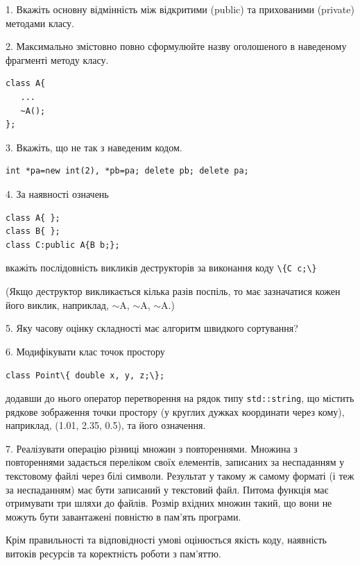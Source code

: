 \documentclass[12pt, ukrainian]{article}
\def\code#1{\Verb!#1!}
\begin{document}
{%
1. Вкажіть основну відмінність між відкритими (public) та прихованими (private) методами класу.%
\par
\vspace{2mm}
2. Максимально змістовно повно сформулюйте назву оголошеного в наведеному фрагменті методу класу.
\vspace{-3mm}
\begin{verbatim}class A{
   ...
   ~A();
};\end{verbatim}
\vspace{-3mm}
\par
\vspace{2mm}
3. Вкажіть, що не так з наведеним кодом.
\vspace{-3mm}
\begin{verbatim}int *pa=new int(2), *pb=pa; delete pb; delete pa;\end{verbatim}
\vspace{-3mm}
\par
\vspace{2mm}
4. За наявності означень
\vspace{-3mm}
\begin{verbatim}
class A{ };
class B{ };
class C:public A{B b;};\end{verbatim}
\vspace{-3mm}
вкажіть послідовність викликів деструкторів за виконання коду \code{\{C c;\}} 

(Якщо деструктор викликається кілька разів поспіль, то має зазначатися кожен його виклик, наприклад, $\sim$A, $\sim$A, $\sim$A.)

\vspace{2mm}
5. Яку часову оцінку складності має алгоритм швидкого сортування?
\par
\vspace{2mm}
6. Модифікувати клас точок простору 

\qquad\code{class Point\{ double x, y, z;\};}


додавши до нього оператор перетворення на рядок типу \code{std::string}, що містить рядкове зображення точки простору (у круглих дужках координати через кому), наприклад, (1.01, 2.35, 0.5), та його означення.%
\par
\vspace{2mm}
7. 
Реалізувати операцію різниці множин з повтореннями. Множина з повтореннями задається переліком своїх елементів, записаних за неспаданням у текстовому файлі через білі символи. Результат у такому ж самому форматі (і теж за неспаданням) має бути записаний у текстовий файл. Питома функція має отримувати три шляхи до файлів. Розмір вхідних множин такий, що вони не можуть бути завантажені повністю в пам’ять програми.

Крім правильності та відповідності умові оцінюється якість коду, наявність витоків ресурсів та коректність роботи з пам'яттю. 

}
\end{document}
